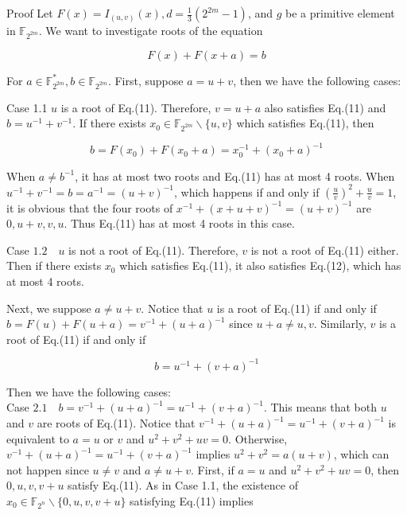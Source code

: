\documentclass[10pt]{article}
\begin{document}
Proof Let $F(x)=I_{(u, v)}(x), d=\frac{1}{3}\left(2^{2 m}-1\right)$, and $g$ be a primitive element in $\mathbb{F}_{2^{2 m}}$. We want to investigate roots of the equation


\begin{equation*}
F(x)+F(x+a)=b \tag{11}
\end{equation*}


For $a \in \mathbb{F}_{2^{2 m}}^{*}, b \in \mathbb{F}_{2^{2 m}}$. First, suppose $a=u+v$, then we have the following cases:

Case 1.1 $u$ is a root of Eq.(11). Therefore, $v=u+a$ also satisfies Eq.(11) and $b=u^{-1}+v^{-1}$. If there exists $x_{0} \in \mathbb{F}_{2^{2 m}} \backslash\{u, v\}$ which satisfies Eq.(11), then


\begin{equation*}
b=F\left(x_{0}\right)+F\left(x_{0}+a\right)=x_{0}^{-1}+\left(x_{0}+a\right)^{-1} \tag{12}
\end{equation*}


When $a \neq b^{-1}$, it has at most two roots and Eq.(11) has at most 4 roots. When $u^{-1}+v^{-1}=b=a^{-1}=(u+v)^{-1}$, which happens if and only if $\left(\frac{u}{v}\right)^{2}+\frac{u}{v}=1$, it is obvious that the four roots of $x^{-1}+(x+u+v)^{-1}=(u+v)^{-1}$ are $0, u+v, v, u$. Thus Eq.(11) has at most 4 roots in this case.

Case $1.2 \quad u$ is not a root of Eq.(11). Therefore, $v$ is not a root of Eq.(11) either. Then if there exists $x_{0}$ which satisfies Eq.(11), it also satisfies Eq.(12), which has at most 4 roots.

Next, we suppose $a \neq u+v$. Notice that $u$ is a root of Eq.(11) if and only if\\
$b=F(u)+F(u+a)=v^{-1}+(u+a)^{-1}$ since $u+a \neq u, v$. Similarly, $v$ is a root of Eq.(11) if and only if

$$
b=u^{-1}+(v+a)^{-1}
$$

Then we have the following cases:\\
Case $2.1 \quad b=v^{-1}+(u+a)^{-1}=u^{-1}+(v+a)^{-1}$. This means that both $u$ and $v$ are roots of Eq.(11). Notice that $v^{-1}+(u+a)^{-1}=u^{-1}+(v+a)^{-1}$ is equivalent to $a=u$ or $v$ and $u^{2}+v^{2}+u v=0$. Otherwise, $v^{-1}+(u+a)^{-1}=u^{-1}+(v+a)^{-1}$ implies $u^{2}+v^{2}=a(u+v)$, which can not happen since $u \neq v$ and $a \neq u+v$. First, if $a=u$ and $u^{2}+v^{2}+u v=0$, then $0, u, v, v+u$ satisfy Eq.(11). As in Case 1.1, the existence of $x_{0} \in \mathbb{F}_{2^{n}} \backslash\{0, u, v, v+u\}$ satisfying Eq.(11) implies
\end{document}
